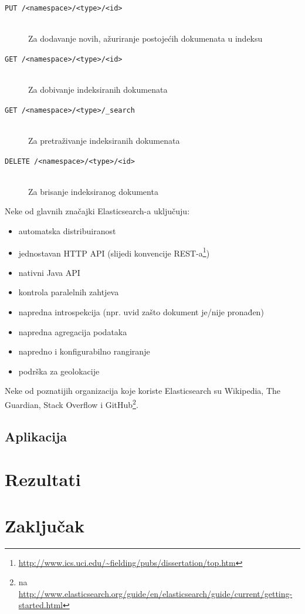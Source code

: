 \documentclass[a4paper,twoside,12pt]{scrreprt}
\begin{document}
\begin{description}
  \item[\texttt{PUT /<namespace>/<type>/<id>}] \hfill \\ Za dodavanje novih, ažuriranje postojećih dokumenata u indeksu
  \item[\texttt{GET /<namespace>/<type>/<id>}] \hfill \\ Za dobivanje indeksiranih dokumenata
  \item[\texttt{GET /<namespace>/<type>/\_search}] \hfill \\ Za pretraživanje indeksiranih dokumenata
  \item[\texttt{DELETE /<namespace>/<type>/<id>}] \hfill \\ Za brisanje indeksiranog dokumenta
\end{description}

Neke od glavnih značajki Elasticsearch-a uključuju:

\begin{itemize}
  \item automatska distribuiranost
  \item jednostavan HTTP API (slijedi konvencije REST-a\footnote{\url{http://www.ics.uci.edu/~fielding/pubs/dissertation/top.htm}})
  \item nativni Java API
  \item kontrola paralelnih zahtjeva
  \item napredna introspekcija (npr. uvid zašto dokument je/nije pronađen)
  \item napredna agregacija podataka
  \item napredno i konfigurabilno rangiranje
  \item podrška za geolokacije
\end{itemize}

Neke od poznatijih organizacija koje koriste Elasticsearch su Wikipedia, The Guardian, Stack Overflow i GitHub\footnote{\cite{elastic} na \url{http://www.elasticsearch.org/guide/en/elasticsearch/guide/current/getting-started.html}}.

\section{Aplikacija}

\chapter{Rezultati}

\chapter{Zaključak}
\end{document}

